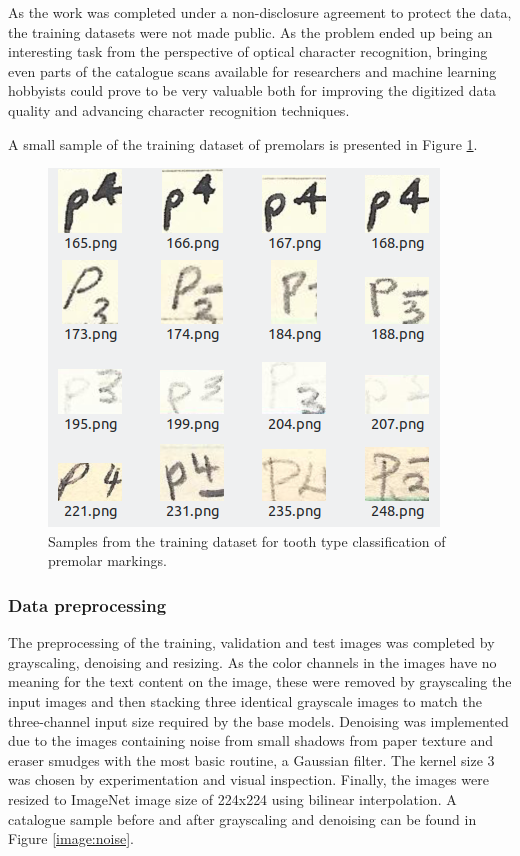\documentclass{article}
\begin{document}
As the work was completed under a non-disclosure agreement to protect the data, the training datasets were not 
made public. As the problem ended up being an interesting task from the perspective of optical character recognition, 
bringing even parts of the catalogue scans available for researchers and machine learning hobbyists could prove to be 
very valuable both for improving the digitized data quality and advancing character recognition techniques.
 
A small sample of the training dataset of premolars is presented in Figure \ref{image:samples}.

\begin{figure}[h]
    \centering
    \includegraphics*[scale=.5]{../images/trainingsamples.png}
    \caption{Samples from the training dataset for tooth type classification of premolar markings.}
    \label{image:samples}
\end{figure}

\subsubsection{Data preprocessing}
 
The preprocessing of the training, validation and test images was completed by grayscaling, denoising and resizing.
As the color channels in the images have no meaning for the text content on the image, these were removed 
by grayscaling the input images and then stacking three identical grayscale images
to match the three-channel input size required by the base models.
Denoising was implemented due to the images containing noise from small shadows from 
paper texture and eraser smudges with the most basic routine, a Gaussian filter.
The kernel size 3 was chosen by experimentation and visual inspection. Finally, the images were resized to 
ImageNet image size of 224x224 using bilinear interpolation. A catalogue sample before and after grayscaling and denoising can 
be found in Figure \ref{image:noise}.
\end{document}
